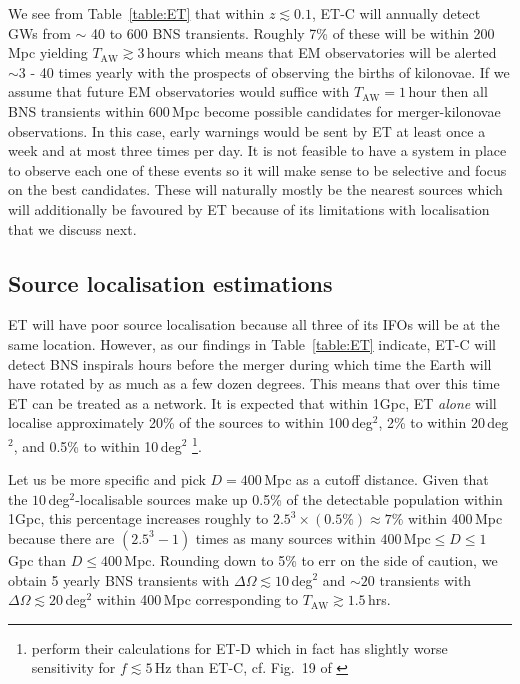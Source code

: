 \documentclass{aa}
\begin{document}
We see from Table~\ref{table:ET} that %
within $z\lesssim 0.1$, %
ET-C will annually detect GWs from $\sim$ 40 to 600 BNS transients.
Roughly 7\% of these will be within 200\,Mpc yielding $T_\text{AW}\gtrsim 3\,$hours which means that EM observatories will be alerted $\sim 3$ - 40 times yearly with the prospects of observing the births of kilonovae.
If we assume that future EM observatories would suffice with $T_\text{AW}=1\,$hour then
all BNS transients within 600\,Mpc become possible candidates for merger-kilonovae observations.
In this case, early warnings would be sent by ET at least once a week and at most three times per day.
It is not feasible to have a system in place to observe each one of these events
so it will make sense to be selective and focus on the best candidates.
These  will naturally mostly be the nearest sources which will additionally be favoured by ET because of its limitations with localisation that we discuss next.

\subsection{Source localisation estimations}
ET will have poor source localisation because all three of its IFOs will be at the same location. 
However, as our findings in Table~\ref{table:ET} indicate, ET-C will
detect BNS inspirals hours before the merger during which time the Earth will have rotated by as much as
a few dozen degrees. This means that over this time ET can be treated as a network.
It is expected that within 1Gpc, ET \emph{alone} will localise approximately 20\% of the sources to within 100\,deg$^2$, 
2\% to within 20\,deg$^2$, and 0.5\% to within 10\,deg$^2$ \citep{Zhao:2017cbb} 
\footnote{\cite{Zhao:2017cbb} perform their calculations for ET-D which in fact has slightly worse sensitivity for $f\lesssim 5\,$Hz than ET-C, cf. Fig.~19 of \cite{GW_IFO_LRR}}.

Let us be more specific and pick $D=400\,$Mpc as a cutoff distance. Given that the $10\,$deg$^{2}$-localisable
sources make up 0.5\% of the detectable population within 1Gpc, this percentage increases roughly to $2.5^3\times (0.5\%)\approx 7\%$ within 400\,Mpc because 
there are $ (2.5^3-1)$ times as many sources within $400\,\text{Mpc}\le D\le 1\,$Gpc than $D\le 400\,$Mpc.
Rounding down to 5\% to err on the side of caution, we obtain 5 yearly BNS transients with $\Delta\Omega \lesssim 10\,$deg$^2$ and $\sim20$ transients with $\Delta\Omega \lesssim 20\,$deg$^2$ within 400\,Mpc corresponding to $T_\text{AW}\gtrsim 1.5\,$hrs.
\end{document}
